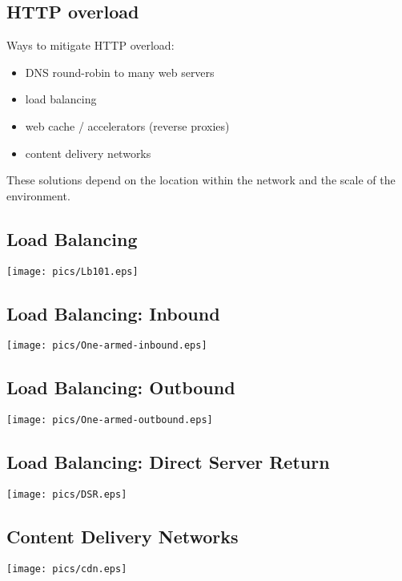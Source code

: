 \documentclass[xga]{xdvislides}
\begin{document}
\subsection{HTTP overload}
Ways to mitigate HTTP overload:

\begin{itemize}
	\item DNS round-robin to many web servers
	\item load balancing
	\item web cache / accelerators (reverse proxies)
	\item content delivery networks
\end{itemize}

These solutions depend on the location within the network and the scale of
the environment.

\subsection{Load Balancing}
\begin{center}
	\texttt{[image: pics/Lb101.eps]}
\end{center}

\subsection{Load Balancing: Inbound}
\begin{center}
	\texttt{[image: pics/One-armed-inbound.eps]}
\end{center}

\subsection{Load Balancing: Outbound}
\begin{center}
	\texttt{[image: pics/One-armed-outbound.eps]}
\end{center}

\subsection{Load Balancing: Direct Server Return}
\begin{center}
	\texttt{[image: pics/DSR.eps]}
\end{center}

\subsection{Content Delivery Networks}
\begin{center}
	\texttt{[image: pics/cdn.eps]}
\end{center}
\end{document}
